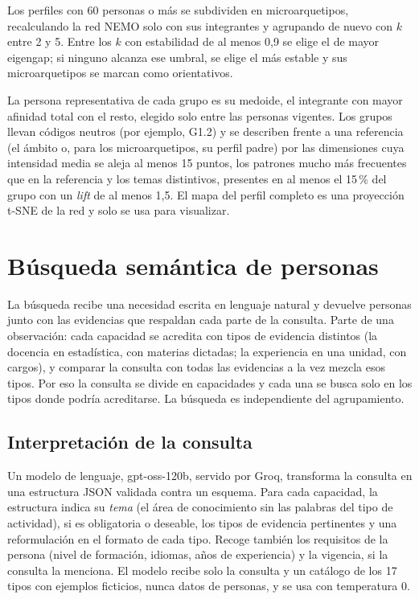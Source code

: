 Los perfiles con 60 personas o más se subdividen en microarquetipos, recalculando la red NEMO solo con sus integrantes y agrupando de nuevo con $k$ entre 2 y 5. Entre los $k$ con estabilidad de al menos 0,9 se elige el de mayor eigengap; si ninguno alcanza ese umbral, se elige el más estable y sus microarquetipos se marcan como orientativos.

La persona representativa de cada grupo es su medoide, el integrante con mayor afinidad total con el resto, elegido solo entre las personas vigentes. Los grupos llevan códigos neutros (por ejemplo, G1.2) y se describen frente a una referencia (el ámbito o, para los microarquetipos, su perfil padre) por las dimensiones cuya intensidad media se aleja al menos 15 puntos, los patrones mucho más frecuentes que en la referencia y los temas distintivos, presentes en al menos el 15\,\% del grupo con un \textit{lift} de al menos 1,5. El mapa del perfil completo es una proyección t-SNE de la red y solo se usa para visualizar.

\section{Búsqueda semántica de personas}
\label{sec:met_busqueda}

La búsqueda recibe una necesidad escrita en lenguaje natural y devuelve personas junto con las evidencias que respaldan cada parte de la consulta. Parte de una observación: cada capacidad se acredita con tipos de evidencia distintos (la docencia en estadística, con materias dictadas; la experiencia en una unidad, con cargos), y comparar la consulta con todas las evidencias a la vez mezcla esos tipos. Por eso la consulta se divide en capacidades y cada una se busca solo en los tipos donde podría acreditarse. La búsqueda es independiente del agrupamiento.

\subsection{Interpretación de la consulta}

Un modelo de lenguaje, gpt-oss-120b, servido por Groq, transforma la consulta en una estructura JSON validada contra un esquema. Para cada capacidad, la estructura indica su \textit{tema} (el área de conocimiento sin las palabras del tipo de actividad), si es obligatoria o deseable, los tipos de evidencia pertinentes y una reformulación en el formato de cada tipo. Recoge también los requisitos de la persona (nivel de formación, idiomas, años de experiencia) y la vigencia, si la consulta la menciona. El modelo recibe solo la consulta y un catálogo de los 17 tipos con ejemplos ficticios, nunca datos de personas, y se usa con temperatura 0.

